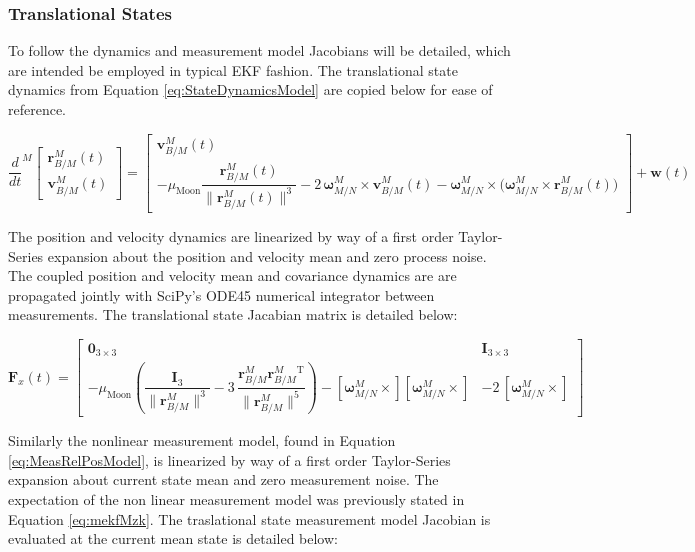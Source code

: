 \documentclass[conf]{new-aiaa}
\newcommand{\vect}[1]{\mathbf{#1}}
\newcommand{\mat}[1]{\mathbf{#1}}
\newcommand{\rBM}{\vect{r}^M_{B/M}}      %
\newcommand{\vBM}{\vect{v}^M_{B/M}}      %
\newcommand{\wMN}{\vect{\omega}^M_{M/N}}
\begin{document}
\subsubsection{Translational States}
To follow the dynamics and measurement model Jacobians will be detailed, which are intended be employed in typical EKF fashion.
The translational state dynamics from Equation \ref{eq:StateDynamicsModel} are copied below for ease of reference.

\begin{equation}
\frac{d}{dt}^M
\begin{bmatrix}
\rBM(t) \\[6pt]
\vBM(t)
\end{bmatrix}
=
\begin{bmatrix}
\vBM(t) \\[6pt]
-\mu_{\mathrm{Moon}} \dfrac{\rBM(t)}{\|\rBM(t)\|^3}
- 2\,\wMN \times \vBM(t)
- \wMN \times \!\big( \wMN \times \rBM(t) \big)
\end{bmatrix}
+ \vect{w}(t)
\label{eq:trans_dynamics}
\end{equation}



The position and velocity dynamics are linearized by way of a first order Taylor-Series expansion about the position and velocity mean and zero process noise. The coupled position and velocity mean and covariance dynamics are are propagated jointly with SciPy's ODE45 numerical integrator between measurements. The translational state Jacabian matrix is detailed below:

\begin{equation}
\mat{F}_x(t) =
\begin{bmatrix}
\vect{0}_{3\times3} & \mat{I}_{3\times3} \\[8pt]
-\mu_{\mathrm{Moon}}
\!\left(
\dfrac{\mat{I}_{3}}{\|\rBM\|^{3}}
- 3\,\dfrac{\rBM\rBM^{\mathrm{T}}}{\|\rBM\|^{5}}
\right) - [\wMN\times][\wMN\times]
& -2\,\left[\wMN\times\right]
\end{bmatrix}
\label{eq:StateJacobianFx}
\end{equation}

 
Similarly the nonlinear measurement model, found in Equation \ref{eq:MeasRelPosModel}, is linearized by way of a first order Taylor-Series expansion about current state mean and zero measurement noise. The expectation of the non linear measurement model was previously stated in Equation \ref{eq:mekfMzk}.  The traslational state measurement model Jacobian is evaluated at the current mean state is detailed below:
\end{document}
